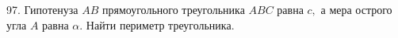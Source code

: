 97. Гипотенуза $AB$ прямоугольного треугольника $ABC$ равна $c,$ а мера острого угла $A$ равна $\alpha.$ Найти периметр треугольника.\\
